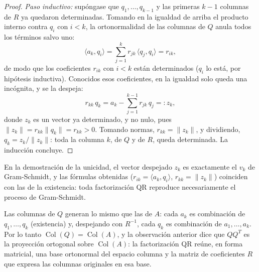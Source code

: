 \documentclass[11pt, a4paper]{article}
\begin{document}
\begin{proof}
\textit{Paso inductivo:} supóngase que $q_1, \dots, q_{k-1}$ y las primeras $k-1$ columnas de $R$ ya quedaron determinadas. Tomando en la igualdad de arriba el producto interno contra $q_i$ con $i < k$, la ortonormalidad de las columnas de $Q$ anula todos los términos salvo uno:
\[
\langle a_k, q_i \rangle = \sum_{j=1}^{k} r_{jk} \, \langle q_j, q_i \rangle = r_{ik},
\]
de modo que los coeficientes $r_{ik}$ con $i < k$ están determinados ($q_i$ lo está, por hipótesis inductiva). Conocidos esos coeficientes, en la igualdad solo queda una incógnita, y se la despeja:
\[
r_{kk} \, q_k = a_k - \sum_{j=1}^{k-1} r_{jk} \, q_j =: z_k,
\]
donde $z_k$ es un vector ya determinado, y no nulo, pues $\|z_k\| = r_{kk} \|q_k\| = r_{kk} > 0$. Tomando normas, $r_{kk} = \|z_k\|$, y dividiendo, $q_k = z_k / \|z_k\|$: toda la columna $k$, de $Q$ y de $R$, queda determinada. La inducción concluye.
\end{proof}

\obs En la demostración de la unicidad, el vector despejado $z_k$ es exactamente el $v_k$ de Gram-Schmidt, y las fórmulas obtenidas ($r_{ik} = \langle a_k, q_i \rangle$, $r_{kk} = \|z_k\|$) coinciden con las de la existencia: toda factorización QR reproduce necesariamente el proceso de Gram-Schmidt.

\obs Las columnas de $Q$ generan lo mismo que las de $A$: cada $a_k$ es combinación de $q_1, \dots, q_k$ (existencia) y, despejando con $R^{-1}$, cada $q_k$ es combinación de $a_1, \dots, a_k$. Por lo tanto $\operatorname{Col}(Q) = \operatorname{Col}(A)$, y la observación anterior dice que $Q Q^T$ es la proyección ortogonal sobre $\operatorname{Col}(A)$: la factorización QR reúne, en forma matricial, una base ortonormal del espacio columna y la matriz de coeficientes $R$ que expresa las columnas originales en esa base.
\end{document}
